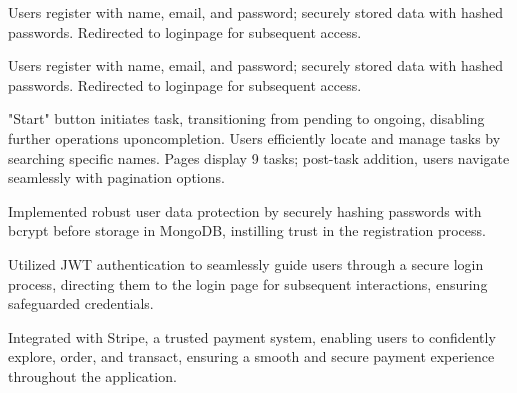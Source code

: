\documentclass[]{plushcv}
\begin{document}
\begin{minipage}[t]{0.70\textwidth}
\begin{tightemize}
\item Users register with name, email, and password; securely stored data with hashed passwords. Redirected to loginpage for subsequent access.
\item Users register with name, email, and password; securely stored data with hashed passwords. Redirected to loginpage for subsequent access.
\item "Start" button initiates task, transitioning from pending to ongoing, disabling further operations uponcompletion. Users efficiently locate and manage tasks by searching specific names. Pages display 9 tasks; post-task addition, users navigate seamlessly with pagination options.
\end{tightemize}
\sectionsep
{} 
\begin{tightemize}
\item Implemented robust user data protection by securely hashing passwords with bcrypt before storage in MongoDB, instilling trust in the registration process.
\item Utilized JWT authentication to seamlessly guide users through a secure login process, directing them to the login page for subsequent interactions, ensuring safeguarded credentials.
\item Integrated with Stripe, a trusted payment system, enabling users to confidently explore, order, and transact, ensuring a smooth and secure payment experience throughout the application.

\end{tightemize}









%
%

\end{minipage} 
\end{document}
